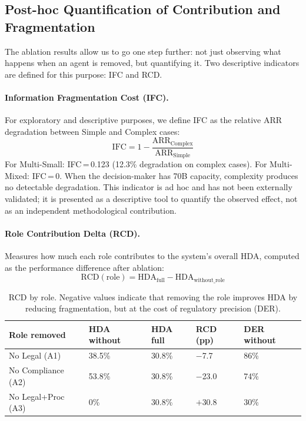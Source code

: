 \documentclass[preprint,12pt,numrefs]{elsarticle}
\begin{document}
\subsection{Post-hoc Quantification of Contribution and Fragmentation}

The ablation results allow us to go one step further: not just observing
what happens when an agent is removed, but quantifying it. Two
descriptive indicators are defined for this purpose: IFC and RCD.

\paragraph{Information Fragmentation Cost (IFC).}
For exploratory and descriptive purposes, we define IFC as the relative
ARR degradation between Simple and Complex cases:
\begin{equation}
  \text{IFC} = 1 - \frac{\text{ARR}_{\text{Complex}}}{\text{ARR}_{\text{Simple}}}
  \label{eq:ifc}
\end{equation}
For Multi-Small: IFC\,=\,0.123 (12.3\% degradation on complex cases).
For Multi-Mixed: IFC\,=\,0. When the decision-maker has 70B capacity,
complexity produces no detectable degradation. This indicator is ad hoc
and has not been externally validated; it is presented as a descriptive
tool to quantify the observed effect, not as an independent
methodological contribution.

\paragraph{Role Contribution Delta (RCD).}
Measures how much each role contributes to the system's overall HDA,
computed as the performance difference after ablation:
\begin{equation}
  \text{RCD}(\text{role}) = \text{HDA}_{\text{full}} - \text{HDA}_{\text{without\_role}}
  \label{eq:rcd}
\end{equation}

\begin{table}[H]
\centering
\small
\caption{RCD by role. Negative values indicate that removing the role
         improves HDA by reducing fragmentation, but at the cost of
         regulatory precision (DER).}
\label{tab:rcd}
\begin{tabular}{lp{2cm}p{2cm}p{1.5cm}p{2cm}}
\toprule
\textbf{Role removed} & \textbf{HDA without} & \textbf{HDA full} &
  \textbf{RCD (pp)} & \textbf{DER without} \\
\midrule
No Legal (A1)            & 38.5\% & 30.8\% & $-$7.7  & 86\% \\
No Compliance (A2)       & 53.8\% & 30.8\% & $-$23.0 & 74\% \\
No Legal+Proc (A3)       &  0\%   & 30.8\% & $+$30.8 & 30\% \\
\bottomrule
\end{tabular}
\end{table}
\end{document}
